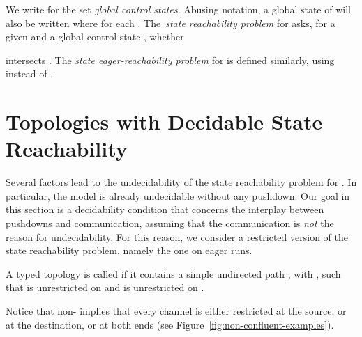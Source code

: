 \documentclass{LMCS}
\newenvironment{definition}{\begin{defi}}{\end{defi}}
\begin{document}
\smallskip

We write  for the set
\emph{global control states}.
Abusing notation, a global state  of  will also be written
 where  for each .
The~\emph{state reachability problem} for \rqcp
asks, for a given \rqcp
 and a global control state , whether

intersects
.
The \emph{state eager-reachability problem} for \rqcp is defined similarly,
using  instead of .


 \section{Topologies with Decidable State Reachability}
   \label{sect:converge}

   Several factors lead to the undecidability of the state
   reachability problem for \rqcp.  In particular, the model is
   already undecidable without any pushdown.  Our goal in this section
   is a decidability condition that concerns the interplay between
   pushdowns and communication, assuming that the communication is
   \emph{not} the reason for undecidability.  For this reason, we consider a
   restricted version of the state reachability problem, namely the
   one on eager runs. 


\begin{definition}\label{def:conv}
  A typed topology  is called
  \emphconverging if it contains a simple undirected path
  , with , such that
   is unrestricted on  and  is unrestricted on .
\end{definition}

Notice that non-\convergence
implies that
every channel is either restricted
at the source, or at the destination, or at both ends
(see Figure~\ref{fig:non-confluent-examples}).
\end{document}
